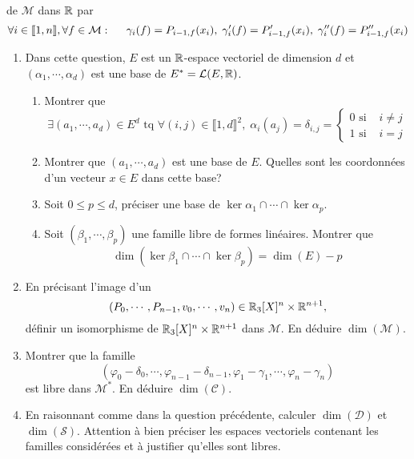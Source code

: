 de $\mathcal{M}$ dans $\mathbb{R}$ par 
\begin{displaymath}
  \forall i\in \llbracket 1,n \rrbracket, \forall f\in \mathcal{M}: \hspace{0.5cm}
\gamma_i(f) = P_{i-1,f}(x_i), \; \gamma'_i(f) = P_{i-1,f}'(x_i), \; \gamma''_i(f) = P_{i-1,f}''(x_i)
\end{displaymath}
\begin{enumerate}
  \item Dans cette question, $E$ est un $\mathbb{R}$-espace vectoriel de dimension $d$ et $(\alpha_1,\cdots,\alpha_d)$ est une base de $E^*=\mathcal{L}(E,\mathbb{R})$.
\begin{enumerate}
  \item  Montrer que 
\begin{displaymath}
\exists (a_1,\cdots,a_d)\in E^d \text{ tq } \forall (i,j)\in \llbracket 1,d \rrbracket^2, \;
\alpha_i(a_j) = \delta_{i,j}=
\left\lbrace 
\begin{aligned}
  0 \text{ si }& i\neq j \\ 1 \text{ si }& i = j
\end{aligned}
\right. 
\end{displaymath}
  \item Montrer que $(a_1,\cdots,a_d)$ est une base de $E$. Quelles sont les coordonnées d'un vecteur $x\in E$ dans cette base?
  \item Soit $0\leq p \leq d$, préciser une base de $\ker \alpha_1 \cap \cdots \cap \ker \alpha_p$.
  \item Soit $(\beta_1,\cdots,\beta_p)$ une famille libre de formes linéaires. Montrer que
\begin{displaymath}
    \dim\left( \ker\beta_1 \cap \cdots \cap \ker \beta_p\right) = \dim(E) - p 
\end{displaymath}
\end{enumerate}

  \item En précisant l'image d'un  
\begin{displaymath}
  (P_0,\cdots,P_{n-1},v_0,\cdots, v_n) \in \mathbb{R}_3[X]^n\times \mathbb{R}^{n+1},
\end{displaymath}
définir un isomorphisme de $\mathbb{R}_3[X]^n\times \mathbb{R}^{n+1}$ dans $\mathcal{M}$. En déduire $\dim(\mathcal{M})$.

  \item Montrer que la famille 
\begin{displaymath}
  \left(\varphi_0 - \delta_0, \cdots, \varphi_{n-1} - \delta_{n-1},\varphi_1 - \gamma_1, \cdots , \varphi_n - \gamma_n\right)  
\end{displaymath}
est libre dans $\mathcal{M}^*$. En déduire $\dim(\mathcal{C})$.

  \item En raisonnant comme dans la question précédente, calculer $\dim(\mathcal{D})$ et $\dim(\mathcal{S})$.\newline
  Attention à bien préciser les espaces vectoriels contenant les familles considérées et à justifier qu'elles sont libres.
\end{enumerate}

